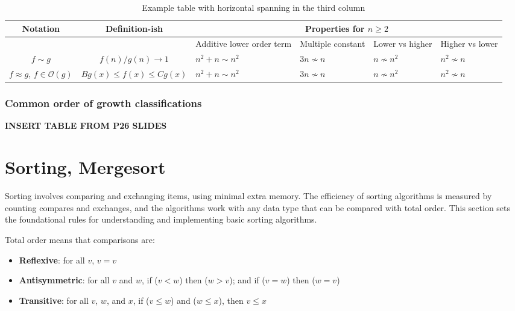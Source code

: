 \documentclass{article}
\begin{document}
\begin{table}[ht]
\centering
\begin{tabularx}{\textwidth}{|c|c|X|X|X|X|} %
\hline
\textbf{Notation} & \textbf{Definition-ish}& \multicolumn{4}{c}{\textbf{Properties for $n \geq 2$}} \\ %
\hline
& & \small Additive lower order term & \small Multiple constant & \small Lower vs higher & \small Higher vs lower \\
\hline
$f \sim g$ & $f(n)/g(n) \to 1$ & $n^2 + n \sim n^2$ & $3n \not\sim n$ & $n \not\sim n^2$ & $n^2 \not\sim n$ \\
\hline
$f \approx g$, $f\in\mathcal{O}(g)$ & $Bg(x)\leq f(x)\leq Cg(x)$ & $n^2 + n \sim n^2$ & $3n \not\sim n$ & $n \not\sim n^2$ & $n^2 \not\sim n$ \\
\hline
\end{tabularx}
\caption{Example table with horizontal spanning in the third column}
\label{table:multicolumn}
\end{table}

\subsubsection{Common order of growth classifications}

\textbf{INSERT TABLE FROM P26 SLIDES}

\section{Sorting, Mergesort}

Sorting involves comparing and exchanging items, using minimal extra memory. The efficiency of sorting algorithms is measured by counting compares and exchanges, and the algorithms work with any data type that can be compared with total order. This section sets the foundational rules for understanding and implementing basic sorting algorithms.

Total order means that comparisons are:

\begin{itemize}
    \item \textbf{Reflexive}: for all $v$, $v=v$
    \item \textbf{Antisymmetric}: for all $v$ and $w$, if ($v<w$) then ($w>v$); and if ($v=w$) then ($w=v$)
    \item \textbf{Transitive}: for all $v$, $w$, and $x$, if ($v\leq w$) and ($w \leq x$), then $v \leq x$
\end{itemize}
\end{document}
